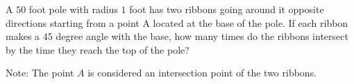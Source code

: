 A $50$ foot pole with radius $1$ foot has two ribbons going around it opposite directions starting from a point A located at the base of the pole. If each ribbon makes a $45$ degree angle with the base, how many times do the ribbons intersect by the time they reach the top of the pole?



Note: The point $A$ is considered an intersection point of the two ribbons.

